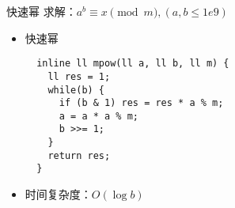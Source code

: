 \begin{frame}[fragile]{快速幂}
  求解：$a^b\equiv x\pmod{m},(a,b\leq 1e9)$
  \vspace{0.5cm}
\begin{itemize}
  \item 快速幂
\begin{lstlisting}
  inline ll mpow(ll a, ll b, ll m) {
    ll res = 1;
    while(b) {
      if (b & 1) res = res * a % m;
      a = a * a % m;
      b >>= 1;
    }
    return res;
  }
\end{lstlisting}
  \item 时间复杂度：$O(\log{b})$
\end{itemize}
\end{frame}